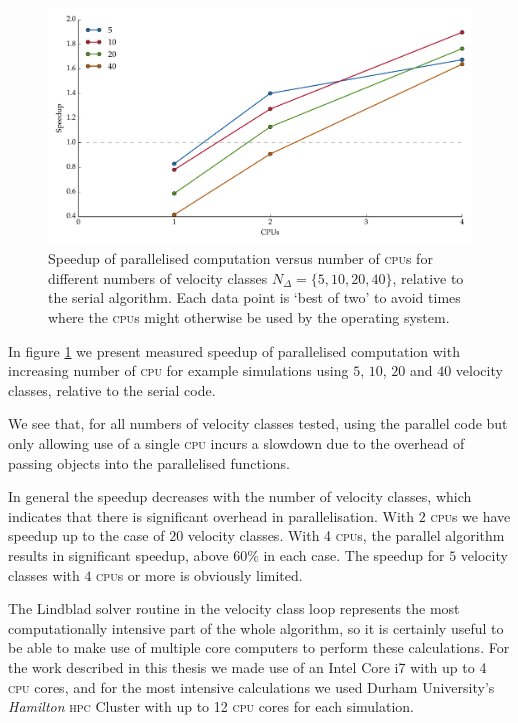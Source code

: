     \begin{figure}[]
      \includegraphics[width=\linewidth]{figs/10_appendices/speedup_cpus.pdf}
      \caption{
      Speedup of parallelised computation versus number of \textsc{cpu}s for
      different numbers of velocity classes $N_\Delta = \{ 5, 10, 20, 40 \}$,
      relative to the serial algorithm. Each data point is `best of two' to
      avoid times where the \textsc{cpu}s might otherwise be used by the
      operating system.
      }
      \label{fig:parallel_delta} 
    \end{figure}

    In figure \ref{fig:parallel_delta} we present measured speedup of
    parallelised computation with increasing number of \textsc{cpu} for example
    simulations using $5$, $10$, $20$ and $40$ velocity classes, relative to the
    serial code.

    We see that, for all numbers of velocity classes tested, using the parallel
    code but only allowing use of a single \textsc{cpu} incurs a slowdown due
    to the overhead of passing objects into the parallelised functions.

    In general the speedup decreases with the number of velocity classes, which
    indicates that there is significant overhead in parallelisation. With $2$
    \textsc{cpu}s we have speedup up to the case of $20$ velocity classes. With
    4 \textsc{cpu}s, the parallel algorithm results in significant speedup,
    above $60\%$ in each case. The speedup for $5$ velocity classes with $4$
    \textsc{cpu}s or more is obviously limited.

    The Lindblad solver routine in the velocity class loop represents the most
    computationally intensive part of the whole algorithm, so it is certainly
    useful to be able to make use of multiple core computers to perform these
    calculations. For the work described in this thesis we made use of an Intel
    Core i7 with up to 4 \textsc{cpu} cores, and for the most intensive
    calculations we used Durham University's \textit{Hamilton} \textsc{hpc}
    Cluster with up to 12 \textsc{cpu} cores for each simulation.

